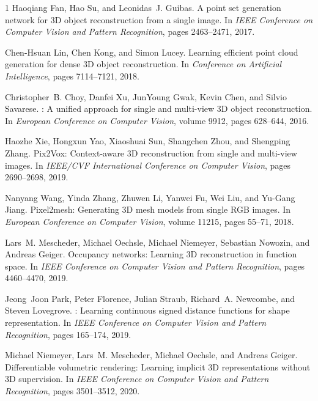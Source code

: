 \begin{thebibliography}{1}
Haoqiang Fan, Hao Su, and Leonidas~J. Guibas.
\newblock A point set generation network for {3D} object reconstruction from a single image.
\newblock In {\em {IEEE} Conference on Computer Vision and Pattern Recognition}, pages 2463--2471, 2017.

Chen{-}Hsuan Lin, Chen Kong, and Simon Lucey.
\newblock Learning efficient point cloud generation for dense {3D} object reconstruction.
\newblock In {\em Conference on Artificial Intelligence}, pages 7114--7121, 2018.

Christopher~B. Choy, Danfei Xu, JunYoung Gwak, Kevin Chen, and Silvio Savarese.
: {A} unified approach for single and multi-view {3D} object reconstruction.
\newblock In {\em European Conference on Computer Vision}, volume 9912, pages 628--644, 2016.

Haozhe Xie, Hongxun Yao, Xiaoshuai Sun, Shangchen Zhou, and Shengping Zhang.
\newblock Pix2{V}ox: Context-aware {3D} reconstruction from single and multi-view images.
\newblock In {\em {IEEE/CVF} International Conference on Computer Vision}, pages 2690--2698, 2019.

Nanyang Wang, Yinda Zhang, Zhuwen Li, Yanwei Fu, Wei Liu, and Yu{-}Gang Jiang.
\newblock Pixel2mesh: {Generating} {3D} mesh models from single {RGB} images.
\newblock In {\em European Conference on Computer Vision}, volume 11215, pages 55--71, 2018.

Lars~M. Mescheder, Michael Oechsle, Michael Niemeyer, Sebastian Nowozin, and Andreas Geiger.
\newblock Occupancy networks: Learning {3D} reconstruction in function space.
\newblock In {\em {IEEE} Conference on Computer Vision and Pattern Recognition}, pages 4460--4470, 2019.

Jeong~Joon Park, Peter Florence, Julian Straub, Richard~A. Newcombe, and Steven Lovegrove.
: Learning continuous signed distance functions for shape representation.
\newblock In {\em {IEEE} Conference on Computer Vision and Pattern Recognition}, pages 165--174, 2019.

Michael Niemeyer, Lars~M. Mescheder, Michael Oechsle, and Andreas Geiger.
\newblock Differentiable volumetric rendering: Learning implicit {3D} representations without {3D} supervision.
\newblock In {\em {IEEE} Conference on Computer Vision and Pattern Recognition}, pages 3501--3512, 2020.


\end{thebibliography}
